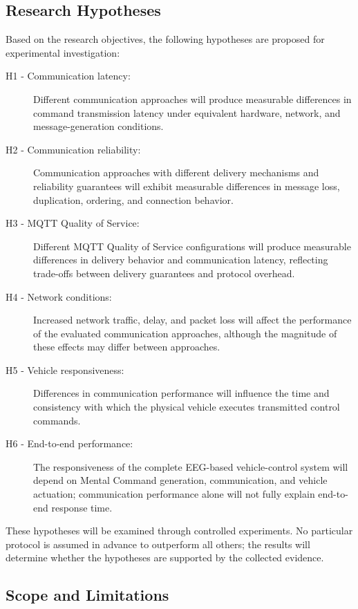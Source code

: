 \subsection{Research Hypotheses}

Based on the research objectives, the following hypotheses are proposed for experimental investigation:

\begin{description}
  \item[H1 - Communication latency:] Different communication approaches will produce measurable differences in command transmission latency under equivalent hardware, network, and message-generation conditions.
  \item[H2 - Communication reliability:] Communication approaches with different delivery mechanisms and reliability guarantees will exhibit measurable differences in message loss, duplication, ordering, and connection behavior.
  \item[H3 - MQTT Quality of Service:] Different MQTT Quality of Service configurations will produce measurable differences in delivery behavior and communication latency, reflecting trade-offs between delivery guarantees and protocol overhead.
  \item[H4 - Network conditions:] Increased network traffic, delay, and packet loss will affect the performance of the evaluated communication approaches, although the magnitude of these effects may differ between approaches.
  \item[H5 - Vehicle responsiveness:] Differences in communication performance will influence the time and consistency with which the physical vehicle executes transmitted control commands.
  \item[H6 - End-to-end performance:] The responsiveness of the complete EEG-based vehicle-control system will depend on Mental Command generation, communication, and vehicle actuation; communication performance alone will not fully explain end-to-end response time.
\end{description}

These hypotheses will be examined through controlled experiments. No particular protocol is assumed in advance to outperform all others; the results will determine whether the hypotheses are supported by the collected evidence.

\subsection{Scope and Limitations}

